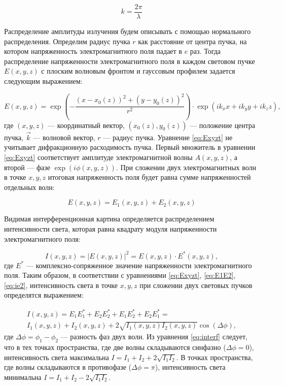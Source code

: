 \begin{equation*}
    k = \frac{2\pi}{\lambda}
\end{equation*}

Распределение амплитуды излучения будем описывать с помощью нормального распределения. Определим радиус пучка $r$ как расстояние от центра пучка, на котором напряженность электромагнитного поля падает в $e$ раз. 
Тогда распределение напряженности электромагнитного поля в каждом световом пучке $E(x, y, z)$ с плоским волновым фронтом и гауссовым профилем задается следующим выражением: 

\begin{equation}
    E(x,y,z) = \exp \left(-\frac{(x-x_0(z))^2+(y-y_0(z))^2}{r^2} \right) \cdot \exp \left(i k_xx+ik_yy+ik_zz\right),
\label{eq:Exyzt}
\end{equation}
где $(x,y,z)$ --- координатный вектор, $(x_0(z),y_0(z))$ --- положение центра пучка, $\vec{k}$ --- волновой вектор, $r$ --- радиус пучка. Уравнение \eqref{eq:Exyzt} не учитывает дифракционную расходимость пучка. 
Первый множитель в уравнении \eqref{eq:Exyzt} соответствует амплитуде электромагнитной волны $A(x,y,z)$, а второй --- фазе $\exp(i\phi(x,y,z))$. 
При сложении двух электромагнитных волн в точке $x, y, z$ итоговая напряженность поля будет равна сумме напряженностей отдельных волн: 

\begin{equation}
    E(x, y, z) = E_1(x, y, z) + E_2(x, y, z)
\label{eq:E1E2}
\end{equation}

Видимая интерференционная картина определяется распределением интенсивности света, которая равна квадрату модуля напряженности электромагнитного поля: 

\begin{equation}
    I(x, y, z) = |E(x, y, z)|^2 = E(x,y,z) \cdot E^*(x,y,z),
\label{eq:ie2}
\end{equation}
где $E^*$ --- комплексно-сопряженное значение напряженности электромагнитного поля. Таким образом, в соответствии с уравнениями \eqref{eq:Exyzt}, \eqref{eq:E1E2}, \eqref{eq:ie2}, интенсивность света в точке $x, y, z$ при сложении двух световых пучков определятся выражением: 

\begin{multline}
    I(x, y, z) = E_1E_1^* + E_2E_2^* + E_1E_2^* + E_2E_1^* = \\
    I_1(x,y,z) + I_2(x,y,z) + 2 \sqrt{I_1(x,y,z)I_2(x,y,z)}\cos(\Delta \phi),
\label{eq:interf}
\end{multline}
где $\Delta \phi = \phi_1 - \phi_2$ --- разность фаз двух волн. Из уравнения \eqref{eq:interf} следует, что в тех точках пространства, где две волны складываются синфазно ($\Delta \phi = 0$), интенсивность света максимальна $I = I_1 + I_2 + 2\sqrt{I_1I_2}$. В точках пространства, где волны складываются в противофазе ($\Delta \phi = \pi$), интенсивность света минимальна $I = I_1 + I_2 - 2\sqrt{I_1I_2}$.

